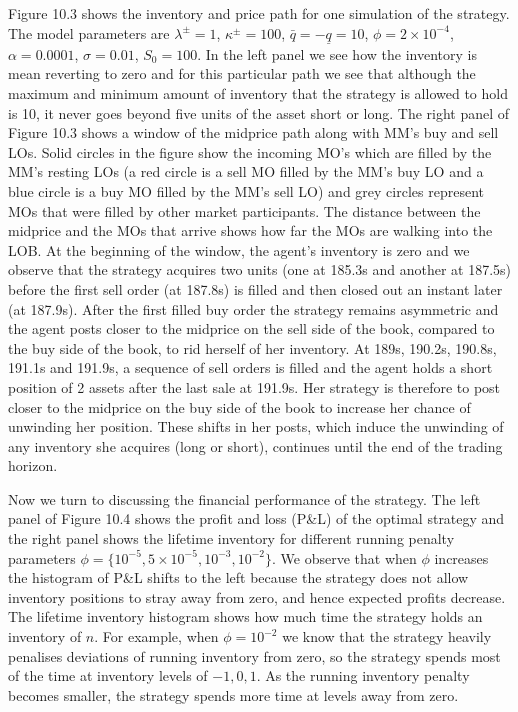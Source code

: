 \documentclass[11pt, a4paper]{book}
\begin{document}
	Figure 10.3 shows the inventory and price path for one simulation of the strategy. The model parameters are $\lambda^\pm = 1$, $\kappa^\pm = 100$, $\bar{q} = -\underline{q} = 10$, $\phi = 2 \times 10^{-4}$, $\alpha = 0.0001$, $\sigma = 0.01$, $S_0 = 100$. In the left panel we see how the inventory is mean reverting to zero and for this particular path we see that although the maximum and minimum amount of inventory that the strategy is allowed to hold is 10, it never goes beyond five units of the asset short or long.
	The right panel of Figure 10.3 shows a window of the midprice path along with MM's buy and sell LOs. Solid circles in the figure show the incoming MO's which are filled by the MM's resting LOs (a red circle is a sell MO filled by the MM's buy LO and a blue circle is a buy MO filled by the MM's sell LO) and grey circles represent MOs that were filled by other market participants. The distance between the midprice and the MOs that arrive shows how far the MOs are walking into the LOB. At the beginning of the window, the agent's inventory is zero and we observe that the strategy acquires two units (one at 185.3s and another at 187.5s) before the first sell order (at 187.8s) is filled and then closed out an instant later (at 187.9s). After the first filled buy order the strategy remains asymmetric and the agent posts closer to the midprice on the sell side of the book, compared to the buy side of the book, to rid herself of her inventory. At 189s, 190.2s, 190.8s, 191.1s and 191.9s, a sequence of sell orders is filled and the agent holds a short position of 2 assets after the last sale at 191.9s. Her strategy is therefore to post closer to the midprice on the buy side of the book to increase her chance of unwinding her position. These shifts in her posts, which induce the unwinding of any inventory she acquires (long or short), continues until the end of the trading horizon.
	
	Now we turn to discussing the financial performance of the strategy. The left panel of Figure 10.4 shows the profit and loss (P\&L) of the optimal strategy and the right panel shows the lifetime inventory for different running penalty parameters $\phi = \{10^{-5}, 5 \times 10^{-5}, 10^{-3}, 10^{-2}\}$. We observe that when $\phi$ increases the histogram of P\&L shifts to the left because the strategy does not allow inventory positions to stray away from zero, and hence expected profits decrease. The lifetime inventory histogram shows how much time the strategy holds an inventory of $n$. For example, when $\phi = 10^{-2}$ we know that the strategy heavily penalises deviations of running inventory from zero, so the strategy spends most of the time at inventory levels of $-1, 0, 1$. As the running inventory penalty becomes smaller, the strategy spends more time at levels away from zero.
	
\end{document}
